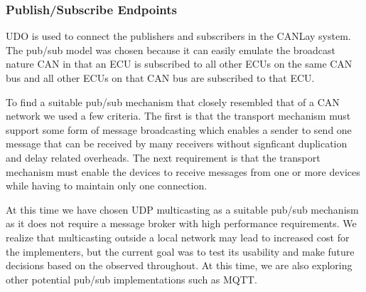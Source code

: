 \documentclass[letterpaper,twocolumn,12pt]{article}
\begin{document}

\subsubsection{Publish/Subscribe Endpoints}
UDO is used to connect the publishers and subscribers in the CANLay system. 
The pub/sub model was chosen because it can easily emulate the broadcast nature CAN in that an ECU is subscribed to all other ECUs on the same CAN bus and all other ECUs on that CAN bus are subscribed to that ECU. 

To find a suitable pub/sub mechanism that closely resembled that of a CAN network we used a few criteria. The first is that the transport mechanism must support some form of message broadcasting which enables a sender to send one message that can be received by many receivers without signficant duplication and delay related overheads. The next requirement is that the transport mechanism must enable the devices to receive messages from one or more devices while having to maintain only one connection. 

At this time we have chosen UDP multicasting as a suitable pub/sub mechanism as it does not require a message broker with high performance requirements. We realize that multicasting outside a local network may lead to increased cost for the implementers, but the current goal was to test its usability and make future decisions based on the observed throughout. At this time, we are also exploring other potential pub/sub implementations such as MQTT.
\end{document}
